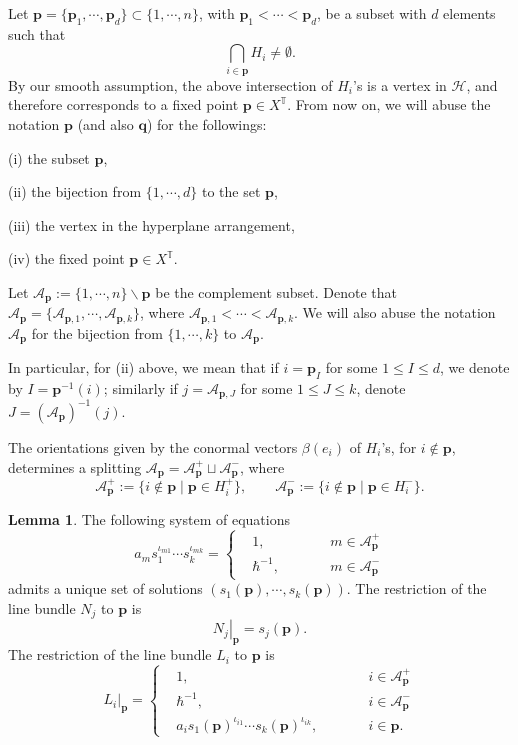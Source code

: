 \documentclass[10pt]{amsart}
\theoremstyle{definition}
\def\TT{\mathbb{T}}
\newcommand{\bp}{\mathbf{p}}
\newcommand{\bq}{\mathbf{q}}
\newcommand{\cA}{\mathcal{A}}
\newcommand{\cH}{\mathcal{H}}
\theoremstyle{definition}
\numberwithin{equation}{section}
\theoremstyle{Theorem}
\newtheorem{Lemma}[Definition]{Lemma}
\begin{document}
Let $\bp = \{\bp_1, \cdots, \bp_d \} \subset \{1, \cdots, n\}$, with $\bp_1 < \cdots < \bp_d$, be a subset with $d$ elements such that
$$
\bigcap_{i\in \bp } H_i \neq \emptyset.
$$
By our smooth assumption, the above intersection of $H_i$'s is a vertex in $\cH$, and therefore corresponds to a fixed point $\bp \in X^\TT$. From now on, we will abuse the notation $\bp$ (and also $\bq$) for the followings:

(i) the subset $\bp$,

(ii) the bijection from $\{1, \cdots, d\}$ to the set $\bp$,

(iii) the vertex in the hyperplane arrangement,

(iv) the fixed point $\bp \in X^\TT$.

Let $\cA_\bp := \{1, \cdots, n \} \backslash \bp$ be the complement subset. Denote that $\cA_\bp = \{ \cA_{\bp,1} , \cdots, \cA_{\bp, k} \}$, where $\cA_{\bp, 1}  < \cdots < \cA_{\bp, k}$. We will also abuse the notation $\cA_\bp$ for the bijection from $\{1, \cdots, k\}$ to $\cA_\bp$.

In particular, for (ii) above, we mean that if $i = \bp_I$ for some $1\leq I\leq d$, we denote by $I = \bp^{-1} (i)$; similarly if $j = \cA_{\bp, J}$ for some $1\leq J\leq k$, denote $J = (\cA_\bp)^{-1} (j)$.

The orientations given by the conormal vectors $\beta (e_i)$ of $H_i$'s, for $i\not\in \bp$, determines a splitting $\cA_\bp = \cA_\bp^+ \sqcup \cA_\bp^-$, where
$$
\cA_\bp^+ := \{i \not\in \bp \mid \bp \in H_i^+ \}, \qquad \cA_\bp^- := \{i \not\in \bp \mid \bp \in H_i^- \}.
$$

\begin{Lemma}
The following system of equations
$$
a_m s_1^{\iota_{m 1}} \cdots s_k^{\iota_{mk}} = \left\{ \begin{aligned}
& 1, \qquad && m \in \cA_\bp^+ \\
& \hbar^{-1}, \qquad && m \in \cA_\bp^-
\end{aligned}\right.
$$
admits a unique set of solutions $(s_1 (\bp), \cdots, s_k (\bp))$. The restriction of the line bundle $N_j$ to $\bp$ is
$$
\left. N_j \right|_{\bp} = s_j (\bp).
$$
The restriction of the line bundle $L_i$ to $\bp$ is
\begin{equation} \label{restriction}
\left.  L_i \right|_\bp = \left\{ \begin{aligned}
& 1 , \qquad && i \in \cA_\bp^+ \\
& \hbar^{-1}, \qquad && i \in \cA_\bp^- \\
& a_i s_1 (\bp)^{\iota_{i1}} \cdots s_k (\bp)^{\iota_{ik}}, \qquad && i \in \bp.
\end{aligned} \right.
\end{equation}
\end{Lemma}
\end{document}

